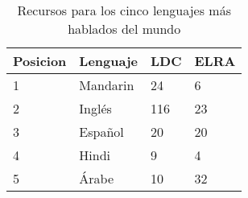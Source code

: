 \begin{table}[H]
\centering
\caption{Recursos para los cinco lenguajes más hablados del mundo \cite{HernndezMena2017}}
\label{tab:resources_by_langauge}
\begin{tabular}{|l|l|l|l|}
\hline
Posicion & Lenguaje & LDC & ELRA \\ \hline
1    & Mandarin & 24  & 6    \\ \hline
2    & Inglés  & 116 & 23   \\ \hline
3    & Español  & 20  & 20   \\ \hline
4    & Hindi    & 9   & 4    \\ \hline
5    & Árabe   & 10  & 32   \\ \hline
\end{tabular}
\end{table}